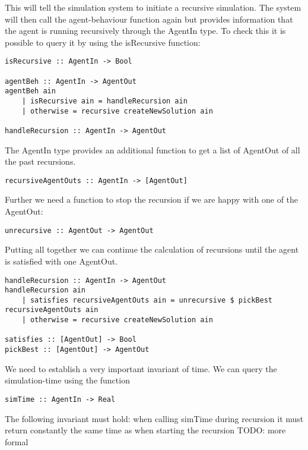 This will tell the simulation system to initiate a recursive simulation. The system will then call the agent-behaviour function again but provides information that the agent is running recursively through the AgentIn type. To check this it is possible to query it by using the isRecursive function:

\begin{lstlisting}[frame=single]
isRecursive :: AgentIn -> Bool

agentBeh :: AgentIn -> AgentOut
agentBeh ain 
	| isRecursive ain = handleRecursion ain
	| otherwise = recursive createNewSolution ain
	
handleRecursion :: AgentIn -> AgentOut
\end{lstlisting}

The AgentIn type provides an additional function to get a list of AgentOut of all the past recursions. 

\begin{lstlisting}[frame=single]
recursiveAgentOuts :: AgentIn -> [AgentOut]
\end{lstlisting}

Further we need a function to stop the recursion if we are happy with one of the AgentOut:

\begin{lstlisting}[frame=single]
unrecursive :: AgentOut -> AgentOut
\end{lstlisting}

Putting all together we can continue the calculation of recursions until the agent is satisfied with one AgentOut. 

\begin{lstlisting}[frame=single]
handleRecursion :: AgentIn -> AgentOut
handleRecursion ain 
	| satisfies recursiveAgentOuts ain = unrecursive $ pickBest recursiveAgentOuts ain
	| otherwise = recursive createNewSolution ain

satisfies :: [AgentOut] -> Bool
pickBest :: [AgentOut] -> AgentOut
\end{lstlisting}

We need to establish a very important invariant of time. We can query the simulation-time using the function
\begin{lstlisting}[frame=single]
simTime :: AgentIn -> Real
\end{lstlisting}

The following invariant must hold: when calling simTime during recursion it must return constantly the same time as when starting the recursion
TODO: more formal

